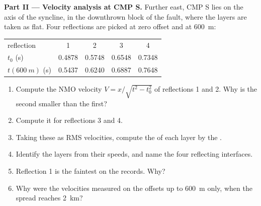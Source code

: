 \begin{problem}
\noindent\textbf{Part II --- Velocity analysis at CMP S.} Further east, CMP S
lies on the axis of the syncline, in the downthrown block of the fault, where
the layers are taken as flat. Four reflections are picked at zero offset and at
\qty{600}{m}:
\begin{center}
\small
\begin{tabular}{lcccc}
\hline
reflection & 1 & 2 & 3 & 4 \\
$t_0$ (\unit{s}) & 0.4878 & 0.5748 & 0.6548 & 0.7348 \\
$t(\qty{600}{m})$ (\unit{s}) & 0.5437 & 0.6240 & 0.6887 & 0.7648 \\
\hline
\end{tabular}
\end{center}
\begin{enumerate}[resume]
  \item Compute the NMO velocity $V = x/\sqrt{t^2 - t_0^2}$ of reflections 1
        and 2. Why is the second smaller than the first?
  \item Compute it for reflections 3 and 4.
  \item Taking these as RMS velocities, compute the  of each
        layer by the .
  \item Identify the layers from their speeds, and name the four reflecting
        interfaces.
  \item Reflection 1 is the faintest on the records. Why?
  \item Why were the velocities measured on the offsets up to \qty{600}{m}
        only, when the spread reaches \qty{2}{km}?
\end{enumerate}


\end{problem}
